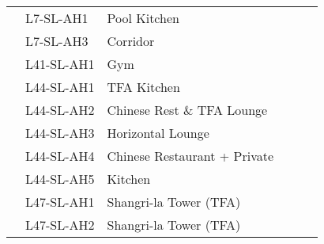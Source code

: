 \begin{table}[htbp]
\begin{tabular}{llp{3.2cm} c c l}
\inc	 	 &L7-SL-AH1	 &Pool Kitchen	 	 	  &  & &\\
 
\inc	 	 &L7-SL-AH3	 &Corridor	 	 	 &  & &\\
\inc	 &L41-SL-AH1	 &Gym	 	 	  	 &	 & &\\
\inc	 &L44-SL-AH1	 &TFA Kitchen	 	 	 && 	 & \\	 
\inc	 	 &L44-SL-AH2	 &Chinese Rest \& TFA Lounge	 &	&  & \\ 	  	 	 
\inc	 	 &L44-SL-AH3	 &Horizontal Lounge	 	 	&  & &\\	 	 
\inc	 	 &L44-SL-AH4	 &Chinese Restaurant + Private	&&  & \\	 	 
\inc	 	 &L44-SL-AH5	 &Kitchen	 	 	  	& 	& & \\ 
\midrule

\inc	 	 &L47-SL-AH1	 &Shangri-la Tower (TFA)	 	  	&&	 &\\
\inc	 	 &L47-SL-AH2	 &Shangri-la Tower (TFA)	 		&&	 &\\
\bottomrule
\end{tabular}

\end{table}



